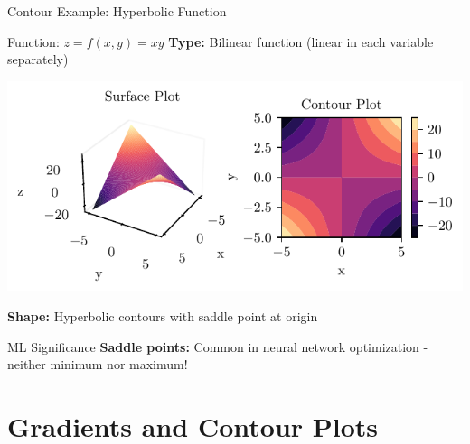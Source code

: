 \documentclass[10pt]{beamer}
\newcommand{\fitpic}[1]{\begin{adjustbox}{max width=\linewidth, max totalheight=0.78\textheight}#1\end{adjustbox}}
\begin{document}
\begin{frame}{Contour Example: Hyperbolic Function}
\begin{examplebox}{Function: $z = f(x,y) = xy$}
\textbf{Type:} Bilinear function (linear in each variable separately)
\end{examplebox}

\begin{center}
\fitpic{\includegraphics[width=0.8\linewidth]{../assets/mathematical-ml/figures/contour-x_times_y.pdf}}
\end{center}

\begin{keypointsbox}
\textbf{Shape:} Hyperbolic contours with saddle point at origin
\end{keypointsbox}

\begin{alertbox}{ML Significance}
\textbf{Saddle points:} Common in neural network optimization - neither minimum nor maximum!
\end{alertbox}
\end{frame}

\section{Gradients and Contour Plots}
\end{document}

